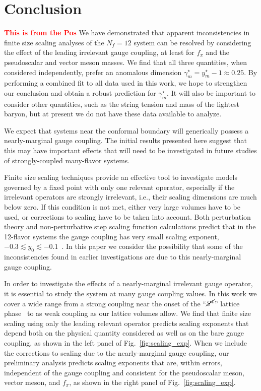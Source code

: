 \documentclass[aps,prl,twocolumn,]{revtex4}  %
\newcommand{\lsim}{\ensuremath{\lesssim} }
\newcommand{\Sb}{\ensuremath{\cancel{S^4}} }
\newcommand{\fig}[1]{Fig.~\ref{#1}}
\newcommand{\TODO}[1]{\textcolor{red}{{\bf #1}}}
\begin{document}
\section{Conclusion}
\TODO{This is from the Pos} We have demonstrated that apparent inconsistencies in finite size scaling analyses of the $N_f=12$ system can be resolved by considering the effect of the leading irrelevant gauge coupling, at least for $f_\pi$ and the pseudoscalar and vector meson masses.
We find that all three quantities, when considered independently, prefer an anomalous dimension $\gamma_m^{\star} = y_m^{\star} - 1 \approx 0.25$.
By performing a combined fit to all data used in this work, we hope to strengthen our conclusion and obtain a robust prediction for $\gamma_m^{\star}$.
It will also be important to consider other quantities, such as the string tension and mass of the lightest baryon, but at present we do not have these data available to analyze.

We expect that systems near the conformal boundary will generically possess a nearly-marginal gauge coupling.
The initial results presented here suggest that this may have important effects that will need to be investigated in future studies of strongly-coupled many-flavor systems.


Finite size scaling techniques provide an effective tool to investigate models governed by a fixed point with only one relevant operator, especially if the irrelevant operators are strongly irrelevant, i.e., their scaling dimensions are much below zero.
If this condition is not met, either very large volumes have to be used, or corrections to scaling have to be taken into account.
Both perturbation theory and non-perturbative step scaling function calculations predict that in the 12-flavor systems the gauge coupling has very small scaling exponent, $-0.3 \lsim y_0 \lsim -0.1$~\cite{Ryttov:2010iz, Appelquist:2009ty}.
In this paper we consider the possibility that some of the inconsistencies found in earlier investigations are due to this nearly-marginal gauge coupling.

In order to investigate the effects of a nearly-marginal irrelevant gauge operator, it is essential to study the system at many gauge coupling values.
In this work we cover a wide range from a strong coupling near the onset of the ``$\Sb$'' lattice phase~\cite{Cheng:2011ic} to as weak coupling as our lattice volumes allow.
We find that finite size scaling using only the leading relevant operator predicts scaling exponents that depend both on the physical quantity considered as well as on the bare gauge coupling, as shown in the left panel of \fig{fig:scaling_exp}.
When we include the corrections to scaling due to the nearly-marginal gauge coupling, our preliminary analysis predicts scaling exponents that are, within errors, independent of the gauge coupling and consistent for the pseudoscalar meson, vector meson, and $f_\pi$, as shown in the right panel of \fig{fig:scaling_exp}.
\end{document}
